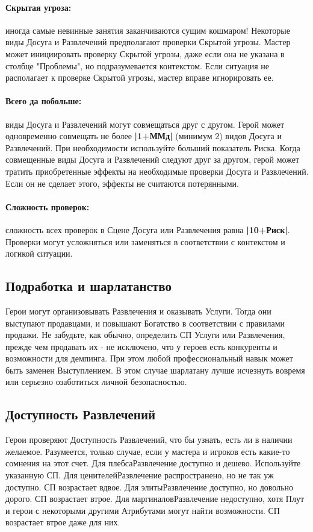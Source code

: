 \paragraph{Скрытая угроза:} иногда самые невинные занятия заканчиваются сущим кошмаром! Некоторые виды Досуга и Развлечений предполагают проверки Скрытой угрозы. Мастер может инициировать проверку Скрытой угрозы, даже если она не указана в столбце "Проблемы", но подразумевается контекстом. Если ситуация не располагает к проверке Скрытой угрозы, мастер вправе игнорировать ее.
\paragraph{Всего да побольше:} виды Досуга и Развлечений могут совмещаться друг с другом. Герой может одновременно совмещать не более \textbf{|1+ММд|} (минимум 2) видов Досуга и Развлечений. При необходимости используйте больший показатель Риска.
\newline Когда совмещенные виды Досуга и Развлечений следуют друг за другом, герой может тратить приобретенные эффекты на необходимые проверки Досуга и Развлечений. Если он не сделает этого, эффекты не считаются потерянными.
\paragraph{Сложность проверок:} сложность всех проверок в Сцене Досуга или Развлечения равна \textbf{|10+Риск|}. Проверки могут усложняться или заменяться в соответствии с контекстом и логикой ситуации.

\subsection{Подработка и шарлатанство}
Герои могут организовывать Развлечения и оказывать Услуги. Тогда они выступают продавцами, и повышают Богатство в соответствии с правилами продажи. Не забудьте, как обычно, определить СП Услуги или Развлечения, прежде чем продавать их - не исключено, что у героев есть конкуренты и возможности для демпинга.
\newline При этом любой профессиональный навык может быть заменен Выступлением. В этом случае шарлатану лучше исчезнуть вовремя или серьезно озаботиться личной безопасностью.
\subsection{Доступность Развлечений}
Герои проверяют Доступность Развлечений, что бы узнать, есть ли в наличии желаемое. Разумеется, только случае, если у мастера и игроков есть какие-то сомнения на этот счет.
\trouble
{Для плебса}{Развлечение доступно и дешево. Используйте указанную СП.}
{Для ценителей}{Развлечение распространено, но не так уж доступно. СП возрастает вдвое.}
{Для элиты}{Развлечение доступно, но довольно дорого. СП возрастает втрое.}
{Для маргиналов}{Развлечение недоступно, хотя Плут и герои с некоторыми другими Атрибутами могут найти возможности. СП возрастает втрое даже для них.}

